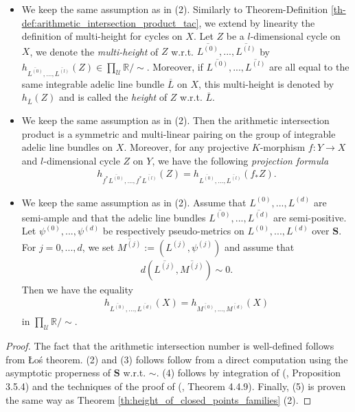 \documentclass [11pt,reqno]{amsart}
\def\bR{{\mathbb{R}}}
\newcommand{\1}{\mathmybb{1}}
\def\cU{{\mathcal{U}}}
\begin{document}
\begin{theorem-definition}
\begin{itemize}
	\item[(3)] We keep the same assumption as in (2). Similarly to Theorem-Definition \ref{th-def:arithmetic_intersection_product_tac}, we extend by linearity the definition of multi-height for cycles on $X$. Let $Z$ be a $l$-dimensional cycle on $X$, we denote the \emph{multi-height} of $Z$ w.r.t. $\overline{L^{(0)}},...,\overline{L^{(l)}}$ by $h_{\overline{L^{(0)}},...,\overline{L^{(l)}}}(Z)\in\prod_{\cU}\bR/\sim$. Moreover, if $\overline{L^{(0)}},...,\overline{L^{(l)}}$ are all equal to the same integrable adelic line bundle $\overline{L}$ on $X$, this multi-height is denoted by $h_{\overline{L}}(Z)$ and is called the \emph{height} of $Z$ w.r.t. $\overline{L}$.
	\item[(4)] We keep the same assumption as in (2). Then the arithmetic intersection product is a symmetric and multi-linear pairing on the group of integrable adelic line bundles on $X$. Moreover, for any projective $K$-morphism $f:Y\to X$ and $l$-dimensional cycle $Z$ on $Y$, we have the following \emph{projection formula}
	\begin{align*}
	h_{f^{\ast}\overline{L^{(0)}},...,f^{\ast}\overline{L^{(l)}}}(Z) = h_{\overline{L^{(0)}},...,\overline{L^{(l)}}}(f_{\ast}Z).
	\end{align*}
	\item[(5)] We keep the same assumption as in (2). Assume that $L^{(0)},...,L^{(d)}$ are semi-ample and that the adelic line bundles $\overline{L^{(0)}},...,\overline{L^{(d)}}$ are semi-positive. Let $\psi^{(0)},...,\psi^{(d)}$ be respectively pseudo-metrics on $L^{(0)},...,L^{(d)}$ over $\mathbf{S}$. For $j=0,...,d$, we set $\overline{M^{(j)}}:=(L^{(j)},\psi^{(j)})$ and assume that 
	\begin{align*}
	d(\overline{L^{(j)}},\overline{M^{(j)}}) \sim 0.
	\end{align*}
	Then we have the equality
	\begin{align*}
	h_{\overline{L^{(0)}},...,\overline{L^{(d)}}}(X) = h_{\overline{M^{(0)}},...,\overline{M^{(d)}}}(X)
	\end{align*}
	in $\prod_{\cU}\bR/\sim$.
\end{itemize}
\end{theorem-definition}

\begin{proof}
The fact that the arithmetic intersection number is well-defined follows from \L{}o\'s theorem. (2) and (3) follows follow from a direct computation using the asymptotic properness of $\mathbf{S}$ w.r.t. $\sim$. (4) follows by integration of (\cite{ChenMori}, Proposition 3.5.4) and the techniques of the proof of (\cite{ChenMori}, Theorem 4.4.9). Finally, (5) is proven the same way as Theorem \ref{th:height_of_closed_points_families} (2).
\end{proof}
\end{document}
